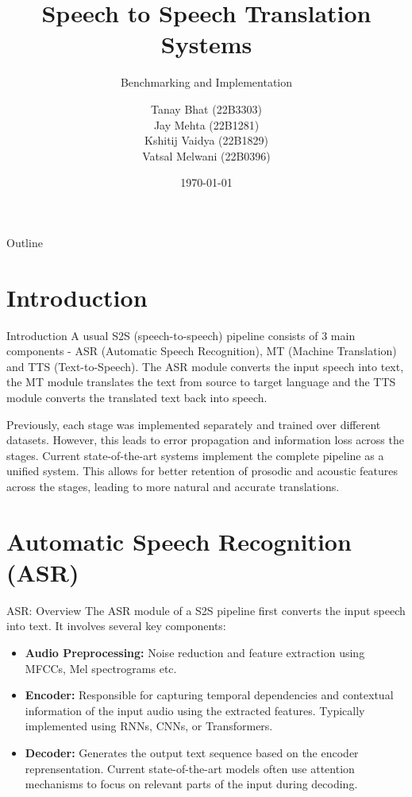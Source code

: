 \documentclass{beamer}
\title[S2S Translation]{Speech to Speech Translation Systems}
\subtitle{Benchmarking and Implementation}
\author[Tanay, Jay, Kshitij, Vatsal]{Tanay Bhat  (22B3303) \\ Jay Mehta (22B1281) \\ Kshitij Vaidya (22B1829) \\ Vatsal Melwani (22B0396)}
\institute[IITB]{IIT Bombay}
\date{\today}
\begin{document}
\begin{frame}
\titlepage
\end{frame}

\begin{frame}{Outline}
\tableofcontents
\end{frame}

\section{Introduction}

\begin{frame}{Introduction}
A usual S2S (speech-to-speech) pipeline consists of 3 main components - ASR (Automatic Speech Recognition), MT (Machine Translation) and TTS (Text-to-Speech). The ASR module converts the input speech into text, the MT module translates the text from source to target language and the TTS module converts the translated text back into speech. 
\newline

Previously, each stage was implemented separately and trained over different datasets. However, this leads to error propagation and information loss across the stages. Current state-of-the-art systems implement the complete pipeline as a unified system. This allows for better retention of prosodic and acoustic features across the stages, leading to more natural and accurate translations.
\end{frame}

\section{Automatic Speech Recognition (ASR)}

\begin{frame}{ASR: Overview}
The ASR module of a S2S pipeline first converts the input speech into text. It involves several key components:
\begin{itemize}
    \item \textbf{Audio Preprocessing:} Noise reduction and feature extraction using MFCCs, Mel spectrograms etc.
    \item \textbf{Encoder:} Responsible for capturing temporal dependencies and contextual information of the input audio using the extracted features. Typically implemented using RNNs, CNNs, or Transformers.
    \item \textbf{Decoder:} Generates the output text sequence based on the encoder reprensentation. Current state-of-the-art models often use attention mechanisms to focus on relevant parts of the input during decoding.
\end{itemize}
\end{frame}
\end{document}
